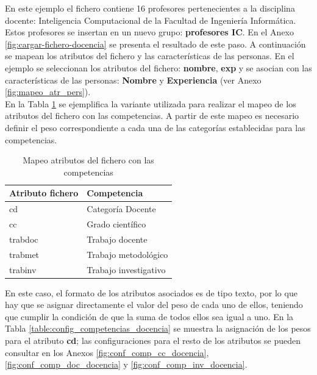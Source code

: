 En este ejemplo el fichero contiene 16 profesores pertenecientes a la disciplina docente: Inteligencia Computacional de la Facultad de Ingeniería Informática. Estos profesores se insertan en un nuevo grupo: \textbf{profesores IC}. En el Anexo \ref{fig:cargar-fichero-docencia} se presenta el resultado de este paso. A continuación se mapean los atributos del fichero y las características de las personas. En el ejemplo se seleccionan los atributos del fichero: \textbf{nombre}, \textbf{exp} y se asocian con las características de las personas: \textbf{Nombre} y \textbf{Experiencia} (ver Anexo \ref{fig:mapeo_atr_pers}).\\

En la Tabla \ref{table:mapeo_competencias_docencia} se ejemplifica la variante utilizada para realizar el mapeo de los atributos del fichero con las competencias. A partir de este mapeo es necesario definir el peso correspondiente a cada una de las categorías establecidas para las competencias. 


\begin{table}[H]
	\centering
	\caption{Mapeo atributos del fichero con las competencias}\label{table:mapeo_competencias_docencia}
	\begin{tabular} {l | l}
		\toprule
		\textbf{Atributo fichero} & \textbf{Competencia} \\ \midrule
		cd & Categoría Docente \\ \hline
		cc & Grado científico \\ \hline
		trabdoc & Trabajo docente \\ \hline
		trabmet & Trabajo metodológico \\ \hline
		trabinv & Trabajo investigativo \\ \bottomrule
	\end{tabular}
\end{table}

En este caso, el formato de los atributos asociados es de tipo texto, por lo que hay que se asignar directamente el valor del peso de cada uno de ellos, teniendo que cumplir la condición de que la suma de todos ellos sea igual a uno. En la Tabla \ref{table:config_competencias_docencia} se muestra la asignación de los pesos para el atributo \textbf{cd}; las configuraciones para el resto de los atributos se pueden consultar en los Anexos \ref{fig:conf_comp_cc_docencia}, \ref{fig:conf_comp_doc_docencia} y \ref{fig:conf_comp_inv_docencia}.

